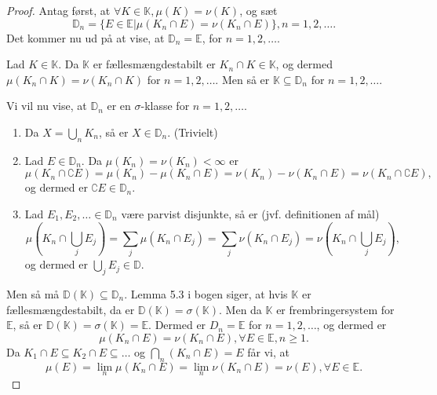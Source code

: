 \documentclass[12pt]{report}
\theoremstyle{break}
\newtheorem*{proof}{Bevis}
\theoremstyle{break}
\newcommand{\EE}{\mathbb{E}}
\newcommand{\K}{\mathbb{K}}
\newcommand{\D}{\mathbb{D}}
\newcommand{\1}{\mathds{1}}
\begin{document}
\begin{proof}
Antag først, at $\forall K\in\K, \mu(K)=\nu(K)$, og sæt \[\D_n = \{E\in\EE\vert\mu(K_n\cap E)=\nu(K_n\cap E)\}, n=1,2,\ldots.\]
Det kommer nu ud på at vise, at $\D_n = \EE$, for $n=1,2,\ldots.$

\bigskip

\noindent Lad $K\in\K$. Da $\K$ er fællesmængdestabilt er $K_n\cap K\in\K$, og dermed $\mu(K_n\cap K)=\nu(K_n\cap K)$ for $n=1,2,\ldots$. Men så er $\K\subseteq\D_n$ for $n=1,2,\ldots$.

\bigskip

\noindent Vi vil nu vise, at $\D_n$ er en $\sigma$-klasse for $n=1,2,\ldots$.
\begin{enumerate}
\item Da $X=\bigcup_n K_n$, så er $X\in\D_n$. (Trivielt)
\item Lad $E\in\D_n$. Da $\mu(K_n)=\nu(K_n)<\infty$ er \[\mu ({K_n} \cap \complement E) = \mu ({K_n}) - \mu ({K_n} \cap E) = \nu ({K_n}) - \nu ({K_n} \cap E) = \nu ({K_n} \cap \complement E),\] og dermed er $\complement E\in\D_n$.
\item Lad $E_1, E_2,\ldots\in\D_n$ være parvist disjunkte, så er (jvf. definitionen af mål)
\[\mu ({K_n} \cap \bigcup\limits_j {{E_j}} ) = \sum\limits_j {\mu ({K_n} \cap {E_j})}  = \sum\limits_j {\nu ({K_n} \cap {E_j})}  = \nu ({K_n} \cap \bigcup\limits_j {{E_j}} ),\]
og dermed er $\bigcup_jE_j\in\D$.
\end{enumerate}
Men så må $\D(\K)\subseteq\D_n$. Lemma 5.3 i bogen siger, at hvis $\K$ er fællesmængdestabilt, da er $\D(\K)=\sigma(\K)$. Men da $\K$ er frembringersystem for $\EE$, så er $\D(\K)=\sigma(\K)=\EE$. Dermed er $D_n = \EE$ for $n=1,2,\ldots$, og dermed er 
\[\mu(K_n\cap E)=\nu(K_n\cap E), \forall E\in\EE, n\geq 1.\]
Da $K_1\cap E\subseteq K_2\cap E\subseteq\ldots$ og $\bigcap_n (K_n\cap E) = E$ får vi, at
\[\mu(E) = \lim_n\mu(K_n\cap E)=\lim_n\nu(K_n\cap E) = \nu(E), \forall E\in\EE.\]
\end{proof}

\newpage
\end{document}
